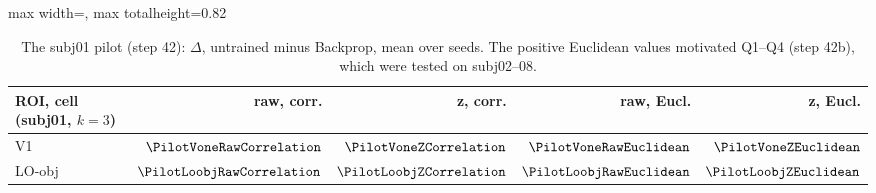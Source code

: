 \begin{table}[H]
\centering
\small
\begin{adjustbox}{max width=\textwidth, max totalheight=0.82\textheight}
\begin{tabular}{@{}lrrrr@{}}
\toprule
ROI, cell (subj01, $k = 3$) & raw, corr. & z, corr. & raw, Eucl. & z, Eucl. \\
\midrule
V1 & $\PilotVoneRawCorrelation$ & $\PilotVoneZCorrelation$ & $\PilotVoneRawEuclidean$ & $\PilotVoneZEuclidean$ \\
LO-obj & $\PilotLoobjRawCorrelation$ & $\PilotLoobjZCorrelation$ & $\PilotLoobjRawEuclidean$ & $\PilotLoobjZEuclidean$ \\
\bottomrule
\end{tabular}
\end{adjustbox}
\caption{The subj01 pilot (step 42): $\Delta$, untrained minus Backprop, mean over seeds. The positive Euclidean values motivated Q1--Q4 (step 42b), which were tested on subj02--08.}
\label{tab:nsdpilot}
\end{table}
